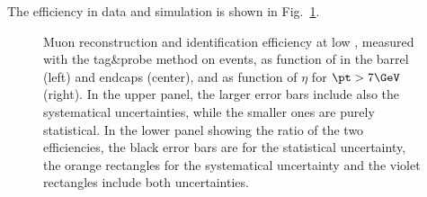 The efficiency in data and simulation is shown in Fig.~\ref{fig:MuonIDEff_1}. 
\begin{figure}[htbp]
  \begin{center}
    \caption{Muon reconstruction and identification efficiency at low \pt, measured with the tag\&probe method on \JPsi events, as function of \pt in the barrel (left) and endcaps (center), and as function of $\eta$ for $\pt > 7\GeV$ (right). In the upper panel, the larger error bars include also the systematical uncertainties, while the smaller ones are purely statistical. In the lower panel showing the ratio of the two efficiencies, the black error bars are for the statistical uncertainty, the orange rectangles for the systematical uncertainty and the violet rectangles include both uncertainties.}
    \label{fig:MuonIDEff_1}
\end{center}
\end{figure}

